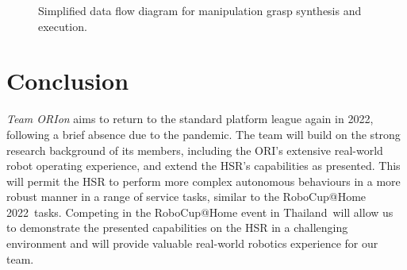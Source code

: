 \documentclass[runningheads,a4paper]{llncs}
\newcommand{\robospecs}{%
  \newpage%
  \pagenumbering{gobble}%
}
\newcommand{\teamori}{Team ORIon}
\newcommand{\competitionyear}{2022}
\newcommand{\competitioncountry}{Thailand}
\begin{document}
\begin{figure}[!t]
	\centering
	\vspace{-10pt}%
	\caption{Simplified data flow diagram for manipulation grasp synthesis and execution.}
	\label{fig:manipulation_data_flow}
	\vspace{-3ex}
\end{figure}


\section{Conclusion}
\textit{\teamori{}} aims to return to the standard platform league again in \competitionyear, following a brief absence due to the pandemic. The team will build on the strong research background of its members, including the ORI's extensive real-world robot operating experience, and extend the HSR's capabilities as presented. This will permit the HSR to perform more complex autonomous behaviours in a more robust manner in a range of service tasks, similar to the RoboCup@Home \competitionyear\ tasks. 
Competing in the RoboCup@Home event in \competitioncountry\ will allow us to demonstrate the presented capabilities on the HSR in a challenging environment and will provide valuable real-world robotics experience for our team.





\robospecs

\end{document}
